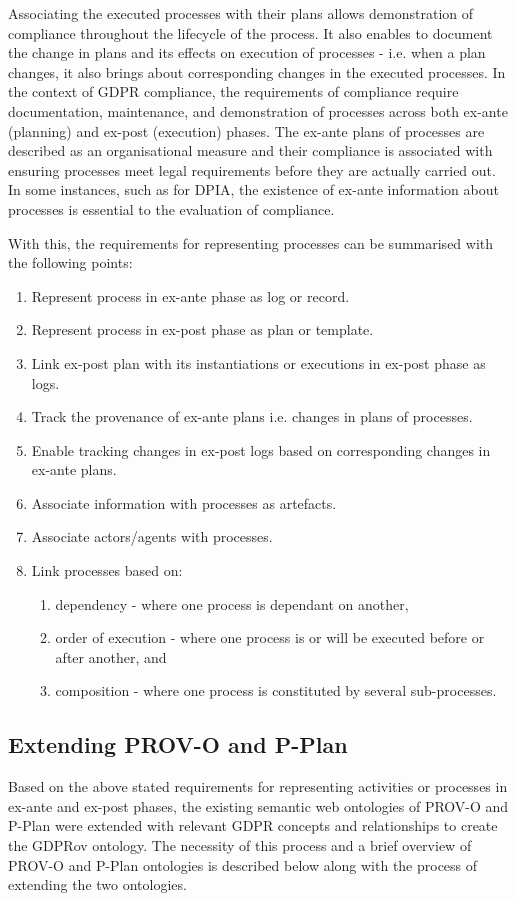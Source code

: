 Associating the executed processes with their plans allows demonstration of compliance throughout the lifecycle of the process. It also enables to document the change in plans and its effects on execution of processes - i.e. when a plan changes, it also brings about corresponding changes in the executed processes. In the context of GDPR compliance, the requirements of compliance require documentation, maintenance, and demonstration of processes across both ex-ante (planning) and ex-post (execution) phases. The ex-ante plans of processes are described as an organisational measure and their compliance is associated with ensuring processes meet legal requirements before they are actually carried out. In some instances, such as for DPIA, the existence of ex-ante information about processes is essential to the evaluation of compliance.

With this, the requirements for representing processes can be summarised with the following points:
\begin{enumerate}
    \item Represent process in ex-ante phase as log or record.
    \item Represent process in ex-post phase as plan or template.
    \item Link ex-post plan with its instantiations or executions in ex-post phase as logs.
    \item Track the provenance of ex-ante plans i.e. changes in plans of processes.
    \item Enable tracking changes in ex-post logs based on corresponding changes in ex-ante plans.
    \item Associate information with processes as artefacts.
    \item Associate actors/agents with processes.
    \item Link processes based on:
        \begin{enumerate}
            \item dependency - where one process is dependant on another,
            \item order of execution - where one process is or will be executed before or after another, and
            \item composition - where one process is constituted by several sub-processes.
        \end{enumerate}
\end{enumerate}

\subsection{Extending PROV-O and P-Plan}
Based on the above stated requirements for representing activities or processes in ex-ante and ex-post phases, the existing semantic web ontologies of PROV-O \cite{} and P-Plan \cite{} were extended with relevant GDPR concepts and relationships to create the GDPRov ontology. The necessity of this process and a brief overview of PROV-O and P-Plan ontologies is described below along with the process of extending the two ontologies.

